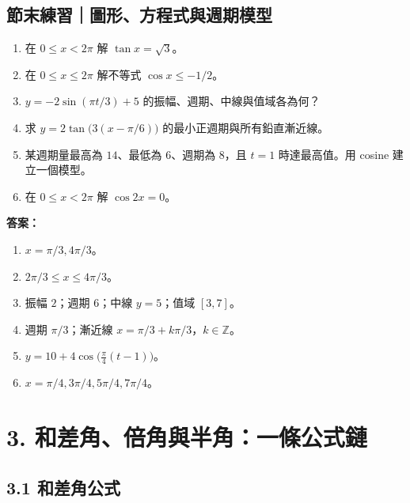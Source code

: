 \documentclass[11pt,a4paper]{article}
\providecommand{\tightlist}{%
  \setlength{\itemsep}{0pt}\setlength{\parskip}{0pt}}
\begin{document}
\begin{HandoutSelfCheck}

\subsection{節末練習｜圖形、方程式與週期模型}\label{ux7bc0ux672bux7df4ux7fd2ux5716ux5f62ux65b9ux7a0bux5f0fux8207ux9031ux671fux6a21ux578b}

\begin{enumerate}
\def\labelenumi{\arabic{enumi}.}
\tightlist
\item
  在 \(0\le x<2\pi\) 解 \(\tan x=\sqrt3\)。
\item
  在 \(0\le x\le2\pi\) 解不等式 \(\cos x\le-1/2\)。
\item
  \(y=-2\sin(\pi t/3)+5\) 的振幅、週期、中線與值域各為何？
\item
  求 \(y=2\tan\bigl(3(x-\pi/6)\bigr)\) 的最小正週期與所有鉛直漸近線。
\item
  某週期量最高為 \(14\)、最低為 \(6\)、週期為 \(8\)，且 \(t=1\) 時達最高值。用 cosine 建立一個模型。
\item
  在 \(0\le x<2\pi\) 解 \(\cos2x=0\)。
\end{enumerate}

\textbf{答案：}

\begin{enumerate}
\def\labelenumi{\arabic{enumi}.}
\tightlist
\item
  \(x=\pi/3,4\pi/3\)。
\item
  \(2\pi/3\le x\le4\pi/3\)。
\item
  振幅 \(2\)；週期 \(6\)；中線 \(y=5\)；值域 \([3,7]\)。
\item
  週期 \(\pi/3\)；漸近線 \(x=\pi/3+k\pi/3\)，\(k\in\mathbb Z\)。
\item
  \(y=10+4\cos\bigl(\tfrac\pi4(t-1)\bigr)\)。
\item
  \(x=\pi/4,3\pi/4,5\pi/4,7\pi/4\)。
\end{enumerate}

\end{HandoutSelfCheck}

\section{3. 和差角、倍角與半角：一條公式鏈}\label{ux548cux5deeux89d2ux500dux89d2ux8207ux534aux89d2ux4e00ux689dux516cux5f0fux93c8}

\subsection{3.1 和差角公式}\label{ux548cux5deeux89d2ux516cux5f0f}
\end{document}
